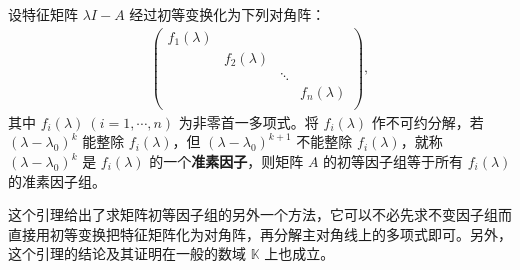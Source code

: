 \documentclass[../../main.tex]{subfiles}
\begin{document}
\begin{lemma}\label{lemma:初等因子组等于准素因子组}
设特征矩阵 $\lambda I - A$ 经过初等变换化为下列对角阵：
\begin{align}\label{equation7629}
\left( \begin{matrix}
f_1(\lambda )&		&		&		\\
&		f_2(\lambda )&		&		\\
&		&		\ddots&		\\
&		&		&		f_n(\lambda )\\
\end{matrix} \right) ,
\end{align}
其中 $f_i(\lambda)\ (i = 1,\cdots,n)$ 为非零首一多项式。将 $f_i(\lambda)$ 作不可约分解，若 $(\lambda - \lambda_0)^k$ 能整除 $f_i(\lambda)$，但 $(\lambda - \lambda_0)^{k + 1}$ 不能整除 $f_i(\lambda)$，就称 $(\lambda - \lambda_0)^k$ 是 $f_i(\lambda)$ 的一个\textbf{准素因子}，则矩阵 $A$ 的初等因子组等于所有 $f_i(\lambda)$ 的准素因子组。
\end{lemma}
\begin{remark}
这个引理给出了求矩阵初等因子组的另外一个方法，它可以不必先求不变因子组而直接用初等变换把特征矩阵化为对角阵，再分解主对角线上的多项式即可。另外，这个引理的结论及其证明在一般的数域 $\mathbb{K}$ 上也成立。 
\end{remark}
\end{document}
